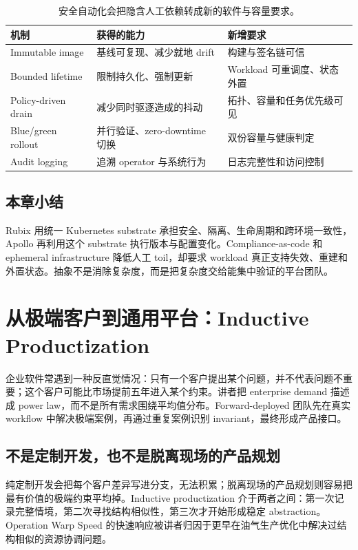 \documentclass[a4paper]{article}
\begin{document}
\begin{table}[H]
\centering
\begin{tabular}{L{0.19\textwidth}L{0.32\textwidth}L{0.39\textwidth}}
\toprule
机制 & 获得的能力 & 新增要求 \\
\midrule
Immutable image & 基线可复现、减少就地 drift & 构建与签名链可信 \\
Bounded lifetime & 限制持久化、强制更新 & Workload 可重调度、状态外置 \\
Policy-driven drain & 减少同时驱逐造成的抖动 & 拓扑、容量和任务优先级可见 \\
Blue/green rollout & 并行验证、zero-downtime 切换 & 双份容量与健康判定 \\
Audit logging & 追溯 operator 与系统行为 & 日志完整性和访问控制 \\
\bottomrule
\end{tabular}
\caption{安全自动化会把隐含人工依赖转成新的软件与容量要求。}
\end{table}

\subsection{本章小结}

Rubix 用统一 Kubernetes substrate 承担安全、隔离、生命周期和跨环境一致性，Apollo 再利用这个 substrate 执行版本与配置变化。Compliance-as-code 和 ephemeral infrastructure 降低人工 toil，却要求 workload 真正支持失效、重建和外置状态。抽象不是消除复杂度，而是把复杂度交给能集中验证的平台团队。

\section{从极端客户到通用平台：Inductive Productization}

企业软件常遇到一种反直觉情况：只有一个客户提出某个问题，并不代表问题不重要；这个客户可能比市场提前五年进入某个约束。讲者把 enterprise demand 描述成 power law，而不是所有需求围绕平均值分布。Forward-deployed 团队先在真实 workflow 中解决极端案例，再通过重复案例识别 invariant，最终形成产品接口。

\subsection{不是定制开发，也不是脱离现场的产品规划}

纯定制开发会把每个客户差异写进分支，无法积累；脱离现场的产品规划则容易把最有价值的极端约束平均掉。Inductive productization 介于两者之间：第一次记录完整情境，第二次寻找结构相似性，第三次才开始形成稳定 abstraction。Operation Warp Speed 的快速响应被讲者归因于更早在油气生产优化中解决过结构相似的资源协调问题。
\end{document}

